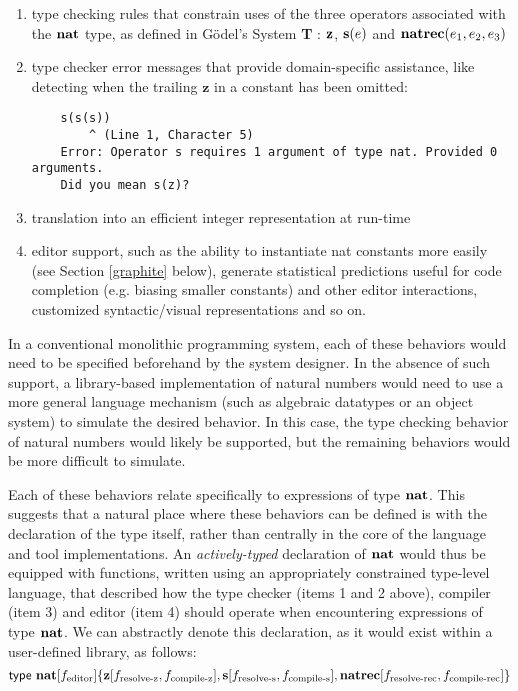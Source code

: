 \begin{enumerate}
\item type checking rules that constrain uses of the three operators associated with the $\textbf{nat}$ type, as defined in G\"{o}del's System \textbf{T} \cite{tapl}: $\textbf{z}$, $\textbf{s}(e)$ and $\textbf{natrec}(e_1, e_2, e_3)$
\item type checker error messages that provide domain-specific assistance, like detecting when the trailing $\textbf{z}$ in a constant has been omitted:
\begin{verbatim}
    s(s(s))
        ^ (Line 1, Character 5)
    Error: Operator s requires 1 argument of type nat. Provided 0 arguments.
    Did you mean s(z)?
\end{verbatim}
\item translation into an efficient integer representation at run-time
\item editor support, such as the ability to instantiate nat constants more easily (see Section \ref{graphite} below), generate statistical predictions useful for code completion (e.g. biasing smaller constants) and other editor interactions, customized syntactic/visual representations and so on.
\end{enumerate}

In a conventional monolithic programming system, each of these behaviors would need to be specified beforehand by the system designer. In the absence of such support, a library-based implementation of natural numbers would need to use a more general language mechanism (such as algebraic datatypes or an object system) to simulate the desired behavior. In this case, the type checking behavior of natural numbers would likely be supported, but the remaining behaviors would be more difficult to simulate.

Each of these behaviors relate specifically to expressions of type $\textbf{nat}$. This suggests that a natural place where these behaviors can be defined is with the declaration of the type itself, rather than centrally in the core of the language and tool implementations. An \emph{actively-typed} declaration of $\textbf{nat}$ would thus be equipped with functions, written using an appropriately constrained type-level language, that described how the type checker (items 1 and 2 above), compiler (item 3) and editor (item 4) should operate when encountering expressions of type $\textbf{nat}$. We can abstractly denote this declaration, as it would exist within a user-defined library, as follows:
\begin{equation*}
{\sf type}~\textbf{nat}[f_{\text{editor}}]\{
\textbf{z}[f_{\text{resolve-z}}, f_{\text{compile-z}}], 
\textbf{s}[f_{\text{resolve-s}}, f_{\text{compile-s}}], 
\textbf{natrec}[f_{\text{resolve-rec}}, f_{\text{compile-rec}}]\}
\end{equation*}

